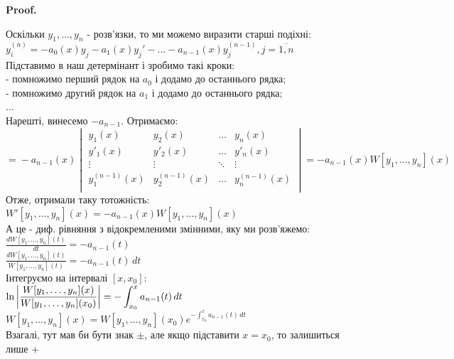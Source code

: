 \documentclass[a4paper, 10pt]{article}
\makeatletter
\def\qed{$\blacksquare$}
\theoremstyle{theoremdd}
\theoremstyle{theoremdd}
\theoremstyle{theoremdd}
\theoremstyle{theoremdd}
\theoremstyle{theoremdd}
\theoremstyle{theoremdd}
\theoremstyle{theoremdd}
\theoremstyle{theoremdd}
\renewenvironment{proof}[1][Proof.\\]{\par
\pushQED{\hfill \qed}%
\normalfont \topsep6\p@\@plus6\p@\relax
\trivlist
\item\relax
{\bfseries
#1\@addpunct{.}}\hspace\labelsep\ignorespaces
}{%
\popQED\endtrivlist\@endpefalse
}
\makeatother
\begin{document}
\begin{proof}
Оскільки $y_1, \dots, y_n$ - розв'язки, то ми можемо виразити старші подіхні:\\
$y^{(n)}_i = -a_0(x)y_j - a_1(x)y_j' -\dots - a_{n-1}(x)y_j^{(n-1)}, j=\overline{1,n}$\\
Підставимо в наш детермінант і зробимо такі кроки:\\
- помножимо перший рядок на $a_0$ і додамо до останнього рядка;\\
- помножимо другий рядок на $a_1$ і додамо до останнього рядка;\\
...\\
Нарешті, винесемо $-a_{n-1}$. Отримаємо:\\
$\displaystyle \boxed{=} -a_{n-1}(x)\begin{vmatrix} 
	y_1(x) &  y_2(x) & \dots & y_n(x) \\ 
	y'_1(x) &  y'_2(x) & \dots & y'_n(x) \\
	\vdots &  \vdots & \ddots & \vdots \\
	y^{(n-1)}_1(x) &  y^{(n-1)}_2(x) & \dots & y^{(n-1)}_n(x) \\ 
\end{vmatrix} = -a_{n-1}(x)W[y_1, \dots, y_n](x)$\\
Отже, отримали таку тотожність:\\
$W'[y_1, \dots, y_n](x) = -a_{n-1}(x)W[y_1, \dots, y_n](x)$\\
А це - диф. рівняння з відокремленими змінними, яку ми розв'яжемо:\\
$\displaystyle \frac{dW[y_1, \dots, y_n](t)}{dt} = -a_{n-1}(t)$\\
$\displaystyle \frac{dW[y_1, \dots, y_n](t)}{W[y_1, \dots, y_n](t)} = -a_{n-1}(t)\,dt$\\
Інтегруємо на інтервалі $[x,x_0]$:\\
$\displaystyle \ln \abs{\frac{W[y_1, \dots, y_n](x)}{W[y_1, \dots, y_n](x_0)}} = - \int_{x_0}^x a_{n-1}(t)\,dt$\\
$\displaystyle W[y_1, \dots, y_n](x) = W[y_1, \dots, y_n](x_0)e^{\displaystyle -\int_{x_0}^x a_{n-1}(t)\,dt}$\\
Взагалі, тут мав би бути знак $\pm$, але якщо підставити $x=x_0$, то залишиться лише $ +$ 
\end{proof}
\end{document}
